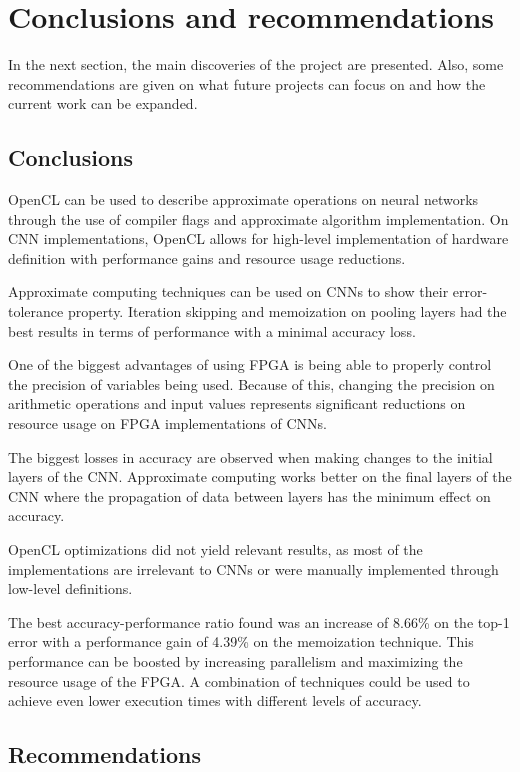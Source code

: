 \chapter{Conclusions and recommendations}

In the next section, the main discoveries of the project are
presented. Also, some recommendations are given on what
future projects can focus on and how the current work
can be expanded.

\section{Conclusions}

OpenCL can be used to describe approximate operations on neural networks through
the use of compiler flags and approximate algorithm
implementation. On CNN implementations, OpenCL allows
for high-level implementation of hardware definition with
performance gains and resource usage reductions.

Approximate computing techniques can be used
on CNNs to show their error-tolerance property. 
Iteration skipping and memoization 
on pooling layers had
the best results in terms of performance with a minimal accuracy loss.

One of the biggest advantages of using FPGA is being able to properly control
the precision of variables being used. Because of this, changing the precision
on arithmetic operations and input values represents significant reductions on resource
usage on FPGA implementations of CNNs.

The biggest losses in accuracy are observed when making changes to
the initial layers of the CNN. Approximate computing works better
on the final layers of the CNN where the propagation of data
between layers has the minimum effect on accuracy.

OpenCL optimizations did not yield relevant results, as most of the
implementations are irrelevant to CNNs or were manually implemented
through low-level definitions.

The best accuracy-performance ratio found was an increase of 8.66\% on the top-1 error
with a performance gain of 4.39\% on the memoization technique.
This performance can be boosted
by increasing parallelism and maximizing the resource usage
of the FPGA. A combination of techniques could be used to achieve even 
lower execution times with different levels of accuracy.

\section{Recommendations}


